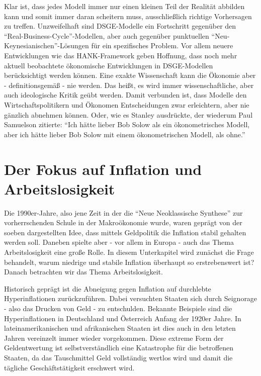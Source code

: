 Klar ist, dass jedes Modell immer nur einen kleinen Teil der Realität abbilden kann und somit immer daran scheitern muss, ausschließlich richtige Vorhersagen zu treffen. Unzweifelhaft sind DSGE-Modelle ein Fortschritt gegenüber den "`Real-Business-Cycle"'-Modellen, aber auch gegenüber punktuellen "`Neu-Keynesianischen"'-Lösungen für ein spezifisches Problem. Vor allem neuere Entwicklungen wie das HANK-Framework geben Hoffnung, dass noch mehr aktuell beobachtete ökonomische Entwicklungen in DSGE-Modellen berücksichtigt werden können. Eine exakte Wissenschaft kann die Ökonomie aber - definitionsgemäß - nie werden. Das heißt, es wird immer wissenschaftliche, aber auch ideologische Kritik geübt werden. Damit verbunden ist, dass Modelle den Wirtschaftspolitikern und Ökonomen Entscheidungen zwar erleichtern, aber nie gänzlich abnehmen können. Oder, wie es Stanley \textcite{Fischer2017} ausdrückte, der wiederum Paul Samuelson zitierte: "`Ich hätte lieber Bob Solow als ein ökonometrisches Modell, aber ich hätte lieber Bob Solow mit einem ökonometrischen Modell, als ohne."'


\section{Der Fokus auf Inflation und Arbeitslosigkeit}
\label{Inflation}
Die 1990er-Jahre, also jene Zeit in der die "`Neue Neoklassische Synthese"' zur vorherrschenden Schule in der Makroökonomie wurde, waren geprägt von der soeben dargestellten Idee, dass mittels Geldpolitik die Inflation stabil gehalten werden soll. Daneben spielte aber - vor allem in Europa - auch das Thema Arbeitslosigkeit eine große Rolle. In diesem Unterkapitel wird zunächst die Frage behandelt, warum niedrige und stabile Inflation überhaupt so erstrebenswert ist? Danach betrachten wir das Thema Arbeitslosigkeit.

Historisch geprägt ist die Abneigung gegen Inflation auf durchlebte Hyperinflationen zurückzuführen. Dabei versuchten Staaten sich durch Seignorage - also das Drucken von Geld - zu entschulden. Bekannte Beispiele sind die Hyperinflationen in Deutschland und Österreich Anfang der 1920er Jahre. In lateinamerikanischen und afrikanischen Staaten ist dies auch in den letzten Jahren vereinzelt immer wieder vorgekommen. Diese extreme Form der Geldentwertung ist selbstverständlich eine Katastrophe für die betroffenen Staaten, da das Tauschmittel Geld vollständig wertlos wird und damit die tägliche Geschäftstätigkeit erschwert wird.

